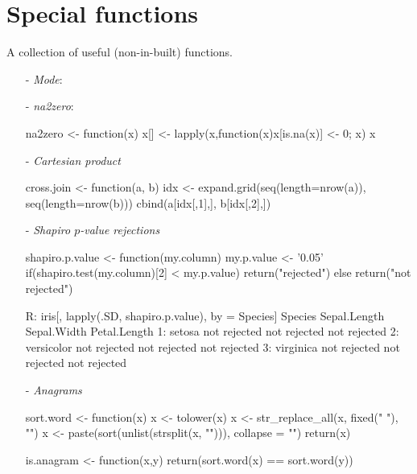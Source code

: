 \renewcommand{\thesection}{A}
\section{Special functions}\label{sec: functions}
A collection of useful (non-in-built) functions.
\bigskip

\begin{itemize}
\item[-] \emph{Mode}:
	
\item[-]\emph{na2zero}:
\begin{example}
na2zero <- function(x) {
	x[] <- lapply(x,function(x){x[is.na(x)] <- 0; x})
	x
}
\end{example}
	
\item[-]\emph{Cartesian product}
\begin{example}
cross.join <- function(a, b) {
	idx <- expand.grid(seq(length=nrow(a)), 
                           seq(length=nrow(b)))
	cbind(a[idx[,1],], b[idx[,2],])
}
\end{example}
	
 \item[-]\emph{Shapiro $p$-value rejections}
\begin{example}
shapiro.p.value <- function(my.column) {
	my.p.value <- '0.05'
	if(shapiro.test(my.column)[2] < my.p.value){
		return("rejected")
	} else {
		return("not rejected")
	}
}
	
R: iris[, lapply(.SD, shapiro.p.value), by = Species]
      Species Sepal.Length  Sepal.Width Petal.Length   
1:     setosa not rejected not rejected not rejected 
2: versicolor not rejected not rejected not rejected 
3:  virginica not rejected not rejected not rejected 
\end{example}
 \item[-] \emph{Anagrams}
\begin{example}
sort.word <- function(x){
 x <- tolower(x)
 x <- str_replace_all(x, fixed(" "), "")    
 x <- paste(sort(unlist(strsplit(x, ""))), collapse = "") 
 return(x)
}

is.anagram <- function(x,y){
    return(sort.word(x) == sort.word(y))
}


\end{example}
\end{itemize}
